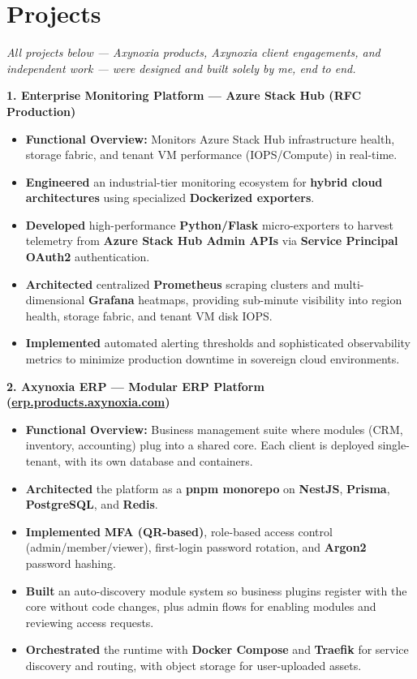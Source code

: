 \documentclass[10pt, letterpaper]{article}
\newenvironment{highlights}{
\begin{itemize}[leftmargin=12pt, itemsep=2pt]
}{
\end{itemize}
}
\begin{document}
\section{Projects}
\textit{All projects below --- Axynoxia products, Axynoxia client engagements, and independent work --- were designed and built solely by me, end to end.}

\textbf{1. Enterprise Monitoring Platform --- Azure Stack Hub (RFC Production)}
\begin{highlights}
\item \textbf{Functional Overview:} Monitors Azure Stack Hub infrastructure health, storage fabric, and tenant VM performance (IOPS/Compute) in real-time.
\item \textbf{Engineered} an industrial-tier monitoring ecosystem for \textbf{hybrid cloud architectures} using specialized \textbf{Dockerized exporters}.
\item \textbf{Developed} high-performance \textbf{Python/Flask} micro-exporters to harvest telemetry from \textbf{Azure Stack Hub Admin APIs} via \textbf{Service Principal OAuth2} authentication.
\item \textbf{Architected} centralized \textbf{Prometheus} scraping clusters and multi-dimensional \textbf{Grafana} heatmaps, providing sub-minute visibility into region health, storage fabric, and tenant VM disk IOPS.
\item \textbf{Implemented} automated alerting thresholds and sophisticated observability metrics to minimize production downtime in sovereign cloud environments.
\end{highlights}

\textbf{2. Axynoxia ERP --- Modular ERP Platform (\href{https://erp.products.axynoxia.com}{erp.products.axynoxia.com})}
\begin{highlights}
\item \textbf{Functional Overview:} Business management suite where modules (CRM, inventory, accounting) plug into a shared core. Each client is deployed single-tenant, with its own database and containers.
\item \textbf{Architected} the platform as a \textbf{pnpm monorepo} on \textbf{NestJS}, \textbf{Prisma}, \textbf{PostgreSQL}, and \textbf{Redis}.
\item \textbf{Implemented} \textbf{MFA (QR-based)}, role-based access control (admin/member/viewer), first-login password rotation, and \textbf{Argon2} password hashing.
\item \textbf{Built} an auto-discovery module system so business plugins register with the core without code changes, plus admin flows for enabling modules and reviewing access requests.
\item \textbf{Orchestrated} the runtime with \textbf{Docker Compose} and \textbf{Traefik} for service discovery and routing, with object storage for user-uploaded assets.
\end{highlights}
\end{document}
